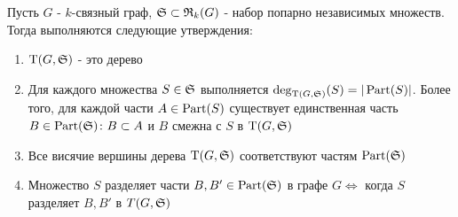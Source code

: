 \documentclass[../main.tex]{subfiles}
\begin{document}
\begin{customthm}{1.1} \label{theorem:1_1}
	Пусть $G$ -  $k$-связный граф, $\S \subset \R_k(G)$ - набор попарно независимых множеств.
	Тогда выполняются следующие утверждения:

	 \begin{enumerate}
		 \item $\wT(G, \S)$ - это дерево \label{stmt:theorem_1_1_1}
		 \item Для каждого множества $S \in \S$ выполняется  $\deg_{\wT(G, \S)}(S) = |\Part(S)|$.
			 Более того, для каждой части  $A \in \Part(S)$ существует единственная часть  $B \in \Part(\S) \colon B \subset A$ и  $B$ смежна с  $S$ в  $\wT(G, \S)$ \label{stmt:theorem_1_1_2}
		 \item Все висячие вершины дерева  $\wT(G, \S)$ соответствуют частям  $\Part(\S)$ \label{stmt:theorem_1_1_3}
		 \item Множество  $S$ разделяет части  $B, B' \in \Part(\S)$ в графе  $G \iff$ когда  $S$ разделяет  $B, B'$ в  $T(G, \S)$ \label{stmt:theorem_1_1_4}
	\end{enumerate}
	
\end{customthm}
\end{document}
